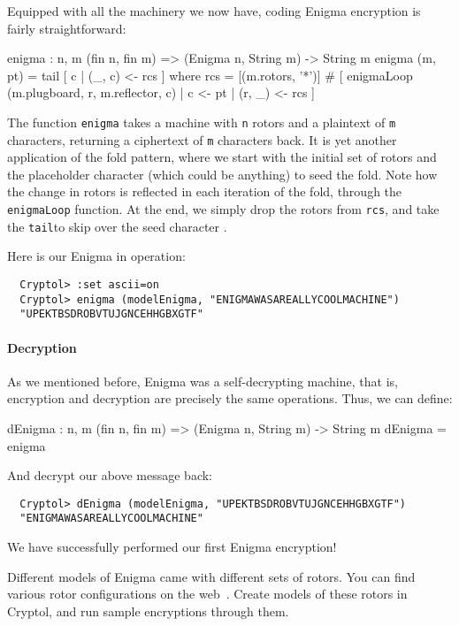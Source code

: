 Equipped with all the machinery we now have, coding Enigma encryption
is fairly straightforward:
\begin{code}
  enigma : {n, m} (fin n, fin m) => (Enigma n, String m) -> String m
  enigma (m, pt) = tail [ c | (_, c) <- rcs ]
    where rcs = [(m.rotors, '*')] # 
                [ enigmaLoop (m.plugboard, r, m.reflector, c)
                | c      <- pt
                | (r, _) <- rcs
                ]
\end{code}
The function {\tt enigma} takes a machine with {\tt n} rotors and a
plaintext of {\tt m} characters, returning a ciphertext of {\tt m}
characters back.  It is yet another application of the fold pattern,
where we start with the initial set of rotors and the placeholder
character {\tt *} (which could be anything) to seed the fold.\indFold
Note how the change in rotors is reflected in each iteration of the
fold, through the {\tt enigmaLoop} function. At the end, we simply
drop the rotors from {\tt rcs}, and take the {\tt tail}\indTail to
skip over the seed character {\tt *}.

Here is our Enigma in operation:
\begin{Verbatim}
  Cryptol> :set ascii=on
  Cryptol> enigma (modelEnigma, "ENIGMAWASAREALLYCOOLMACHINE")
  "UPEKTBSDROBVTUJGNCEHHGBXGTF"
\end{Verbatim}

\paragraph*{Decryption} As we mentioned before, Enigma was a
self-decrypting machine, that is, encryption and decryption are
precisely the same operations. Thus, we can define:
\begin{code}
  dEnigma : {n, m} (fin n, fin m) => (Enigma n, String m) -> String m
  dEnigma = enigma
\end{code}
And decrypt our above message back:
\begin{Verbatim}
  Cryptol> dEnigma (modelEnigma, "UPEKTBSDROBVTUJGNCEHHGBXGTF")
  "ENIGMAWASAREALLYCOOLMACHINE"
\end{Verbatim}
We have successfully performed our first Enigma encryption!

\begin{Exercise}\label{ex:enigma:9}
  Different models of Enigma came with different sets of rotors. You
  can find various rotor configurations on the
  web~\cite{wiki:enigmarotors}.  Create models of these rotors in
  Cryptol, and run sample encryptions through them.
\end{Exercise}

